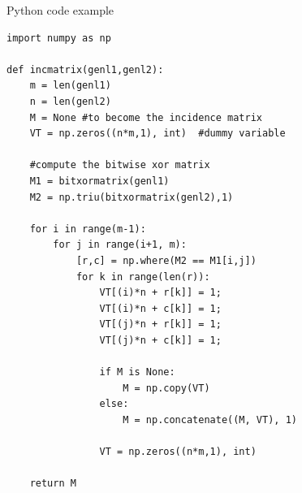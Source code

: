 \documentclass[a4paper]{article}
\begin{document}
\begin{listing}[ht]
\caption{Python code example}
\label{listing:python example}

\begin{verbatim}
import numpy as np
    
def incmatrix(genl1,genl2):
    m = len(genl1)
    n = len(genl2)
    M = None #to become the incidence matrix
    VT = np.zeros((n*m,1), int)  #dummy variable
    
    #compute the bitwise xor matrix
    M1 = bitxormatrix(genl1)
    M2 = np.triu(bitxormatrix(genl2),1) 
    
    for i in range(m-1):
        for j in range(i+1, m):
            [r,c] = np.where(M2 == M1[i,j])
            for k in range(len(r)):
                VT[(i)*n + r[k]] = 1;
                VT[(i)*n + c[k]] = 1;
                VT[(j)*n + r[k]] = 1;
                VT[(j)*n + c[k]] = 1;
    
                if M is None:
                    M = np.copy(VT)
                else:
                    M = np.concatenate((M, VT), 1)
    
                VT = np.zeros((n*m,1), int)
    
    return M
\end{verbatim}
\end{listing}
\end{document}
